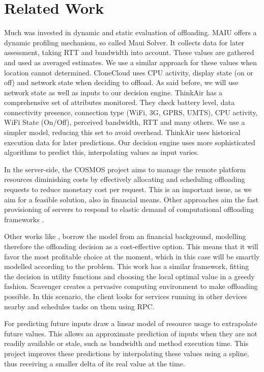 \documentclass[10pt, conference, letterpaper]{IEEEtran}
\begin{document}
  \section{Related Work}

  Much was invested in dynamic and static evaluation of offloading. MAIU \cite{Cuervo:2010:MMS:1814433.1814441} offers a dynamic profiling mechanism, so called Maui Solver. It collects data for later assessment, taking RTT and bandwidth into account. These values are gathered and used as averaged estimates. We use a similar approach for these values when location cannot determined. CloneCloud \cite{Chun:2011:CEE:1966445.1966473} uses CPU activity, display state (on or off) and network state when deciding to offload. As said before, we will use network state as well as inputs to our decision engine. ThinkAir \cite{kosta2012thinkair} has a comprehensive set of attributes monitored. They check battery level, data connectivity presence, connection type (WiFi, 3G, GPRS, UMTS), CPU activity, WiFi State (On/Off), perceived bandwidth, RTT and many others. We use a simpler model, reducing this set to avoid overhead. ThinkAir uses historical execution data for later predictions. Our decision engine uses more sophisticated algorithms to predict this, interpolating values as input varies.

  In the server-side, the COSMOS \cite{Shi:2014:CCO:2632951.2632958} project aims to manage the remote platform resources diminishing costs by effectively allocating and scheduling offloading requests to reduce monetary cost per request. This is an important issue, as we aim for a feasible solution, also in financial means. Other approaches aim the fast provisioning of servers to respond to elastic demand of computational offloading frameworks \cite{Ha:2013:JPC:2462456.2464451}.

  Other works like \cite{6162380}, borrow the model from an financial background, modelling therefore the offloading decision as a cost-effective option. This means that it will favor the most profitable choice at the moment, which in this case will be smartly modelled according to the problem. This work has a similar framework, fitting the decision in utility functions and choosing the local optimal value in a greedy fashion. Scavenger \cite{5466972} creates a pervasive computing environment to make offloading possible. In this scenario, the client looks for services running in other devices nearby and schedules tasks on them using RPC.

  For predicting future inputs \cite{Balan:2003:TRE:1066116.1066125} \cite{Cuervo:2010:MMS:1814433.1814441} \cite{kosta2012thinkair} draw a linear model of resource usage to extrapolate future values. This allows an approximate prediction of inputs when they are not readily available or stale, such as bandwidth and method execution time. This project improves these predictions by interpolating these values using a spline, thus receiving a smaller delta of its real value at the time.
\end{document}
